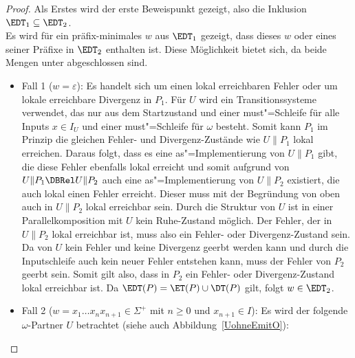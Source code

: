 \begin{proof}
  Als Erstes wird der erste Beweispunkt gezeigt, also die Inklusion $\EDT
  _1\subseteq\EDT _2$.\\
  Es wird für ein präfix-minimales $w$ aus $\EDT _1$ gezeigt, dass dieses $w$
  oder eines seiner Präfixe in $\EDT _2$ enthalten ist. Diese Möglichkeit
  bietet sich, da beide Mengen unter \cont{} abgeschlossen sind.
  \begin{itemize}
    \item Fall 1 ($w=\varepsilon$): Es handelt sich um einen lokal erreichbaren
      Fehler oder um lokale erreichbare Divergenz in $P_1$. Für
      $U$ wird ein Transitionssysteme verwendet, das nur aus dem Startzustand
      und einer must"=Schleife für alle Inputs $x\in I_U$ und einer
      must"=Schleife für $\omega$ besteht. Somit kann $P_1$ im Prinzip die
      gleichen Fehler- und Divergenz-Zustände wie $U\|P_1$ lokal erreichen.
      Daraus folgt, dass es eine as"=Implementierung von $U\|P_1$ gibt, die
      diese Fehler ebenfalls lokal erreicht und somit aufgrund von $U\|P_1
      \DBRel U\|P_2$ auch eine as"=Implementierung von $U\|P_2$ existiert, die
      auch lokal einen Fehler erreicht. Dieser muss mit der Begründung von oben
      auch in $U\|P_2$ lokal erreichbar sein. Durch die Struktur von $U$ ist
      in einer Parallelkomposition mit $U$ kein Ruhe-Zustand möglich. Der
      Fehler, der in $U\|P_2$ lokal erreichbar ist, muss also ein Fehler- oder
      Divergenz-Zustand sein. Da von $U$ kein Fehler und keine
      Divergenz geerbt werden kann und durch die Inputschleife auch kein neuer
      Fehler entstehen kann, muss der Fehler von $P_2$ geerbt
      sein. Somit gilt also, dass in $P_2$ ein Fehler- oder Divergenz-Zustand
      lokal erreichbar ist. Da $\EDT (P) =\ET (P)\cup\DT (P)$ gilt, folgt $w\in
      \EDT _2$.
    \item Fall 2 ($w=x_1\dots x_n x_{n+1}\in\Sigma ^+$ mit $n\geq 0$ und
      $x_{n+1}\in I$): Es wird der folgende $\omega$-Partner $U$ betrachtet
      (siehe auch Abbildung~\ref{UohneEmitO}):
\end{itemize}
\end{proof}
